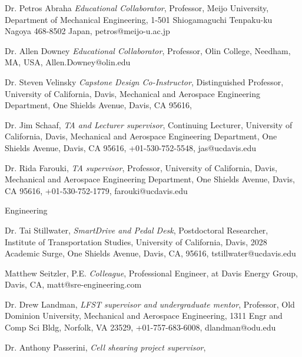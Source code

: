 \documentclass[10pt]{article}
\newenvironment{outerlist}[1][\enskip\textbullet]%
        {\begin{itemize}[#1]}{\end{itemize}%
         \vspace{-.6\baselineskip}}
\newenvironment{innerlist}[1][\enskip\textbullet]%
        {\begin{compactitem}[#1]}{\end{compactitem}}
\begin{document}
\begin{outerlist}
\begin{innerlist}
      \item Dr. Petros Abraha
        \emph{Educational Collaborator},
        Professor,
        Meijo University,
        Department of Mechanical Engineering,
        1-501 Shiogamaguchi Tenpaku-ku Nagoya 468-8502 Japan,
        petros@meijo-u.ac.jp
      \item Dr. Allen Downey
        \emph{Educational Collaborator},
        Professor,
        Olin College,
        Needham, MA, USA,
        Allen.Downey@olin.edu
      \item Dr. Steven Velinsky
        \emph{Capstone Design Co-Instructor},
        Distinguished Professor,
        University of California, Davis,
        Mechanical and Aerospace Engineering Department,
        One Shields Avenue, Davis, CA 95616,
      \item Dr. Jim Schaaf,
        \emph{TA and Lecturer supervisor},
        Continuing Lecturer,
        University of California, Davis,
        Mechanical and Aerospace Engineering Department,
        One Shields Avenue, Davis, CA 95616,
        +01-530-752-5548,
        jas@ucdavis.edu
      \item Dr. Rida Farouki,
        \emph{TA supervisor},
        Professor,
        University of California, Davis,
        Mechanical and Aerospace Engineering Department,
        One Shields Avenue, Davis, CA 95616,
        +01-530-752-1779,
        farouki@ucdavis.edu
    \end{innerlist}
  \item[] Engineering
    \begin{innerlist}
      \item Dr. Tai Stillwater,
        \emph{SmartDrive and Pedal Desk},
        Postdoctoral Researcher,
        Institute of Transportation Studies,
        University of California, Davis,
        2028 Academic Surge, One Shields Avenue, Davis, CA, 95616,
        tstillwater@ucdavis.edu
      \item Matthew Seitzler, P.E. \emph{Colleague},
        Professional Engineer, at Davis Energy Group, Davis, CA,
        matt@sre-engineering.com
      \item Dr. Drew Landman,
        \emph{LFST supervisor and undergraduate mentor},
        Professor,
        Old Dominion University,
        Mechanical and Aerospace Engineering,
        1311 Engr and Comp Sci Bldg, Norfolk, VA 23529,
        +01-757-683-6008,
        dlandman@odu.edu
      \item Dr. Anthony Passerini,
        \emph{Cell shearing project supervisor},

\end{innerlist}
\end{outerlist}
\end{document}
